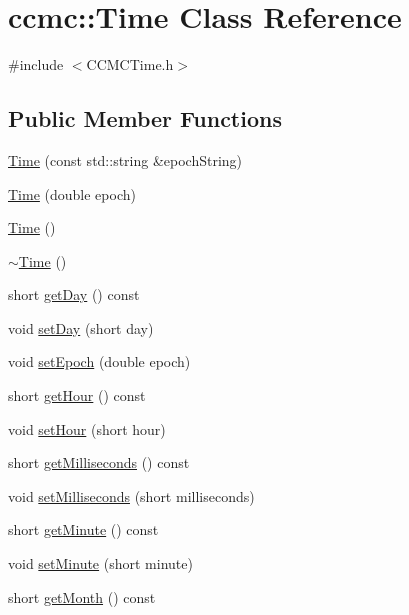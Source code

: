 \hypertarget{classccmc_1_1_time}{\section{ccmc\-:\-:Time Class Reference}
\label{classccmc_1_1_time}
}


{\ttfamily \#include $<$C\-C\-M\-C\-Time.\-h$>$}

\subsection*{Public Member Functions}
\begin{DoxyCompactItemize}
\item 
\hyperlink{classccmc_1_1_time_a763ddfbb61c5e3c89de19d474df83925}{Time} (const std\-::string \&epoch\-String)
\item 
\hyperlink{classccmc_1_1_time_a6c2d0426c9f564a1ac65a6965ff244eb}{Time} (double epoch)
\item 
\hyperlink{classccmc_1_1_time_a6cae04a7873180db02921a6f7d5b8d79}{Time} ()
\item 
\hyperlink{classccmc_1_1_time_a0ed8fa35bd3f5a14a8017dbf0c24a584}{$\sim$\-Time} ()
\item 
short \hyperlink{classccmc_1_1_time_ad7bb606aa958aff81f571ce93b9f3c26}{get\-Day} () const 
\item 
void \hyperlink{classccmc_1_1_time_aa9de7a701b5c9ecbf2b79aadf60cf754}{set\-Day} (short day)
\item 
void \hyperlink{classccmc_1_1_time_a13ac1b91c6d906cf6b116e1f0b7fd08d}{set\-Epoch} (double epoch)
\item 
short \hyperlink{classccmc_1_1_time_a685b4bb32ab9525d3484a9f70833bf34}{get\-Hour} () const 
\item 
void \hyperlink{classccmc_1_1_time_afe8e5bc96dcbecc80a2ace52a08f4724}{set\-Hour} (short hour)
\item 
short \hyperlink{classccmc_1_1_time_ab4941ef0134eea8c757ccec87cd1f9df}{get\-Milliseconds} () const 
\item 
void \hyperlink{classccmc_1_1_time_a660c43e3c4881d97011a625eecfaee1a}{set\-Milliseconds} (short milliseconds)
\item 
short \hyperlink{classccmc_1_1_time_a7edc08ff8d6b060e4315c8544f66ae32}{get\-Minute} () const 
\item 
void \hyperlink{classccmc_1_1_time_a14044e974d54b1a10870bf0d4a14ce52}{set\-Minute} (short minute)
\item 
short \hyperlink{classccmc_1_1_time_a5b05533618e52a76d07a35bc6cc6d248}{get\-Month} () const 

\end{DoxyCompactItemize}
